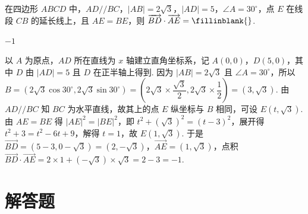 \begin{problem}
在四边形 \(ABCD\) 中，\(AD//BC\)，\(|AB|=2\sqrt3\)，\(|AD|=5\)，\(\angle A=30^\circ\)，点 \(E\) 在线段 \(CB\) 的延长线上，且 \(AE=BE\)，则 \(\overrightarrow{BD}\cdot\overrightarrow{AE}=\fillinblank{}\).
\end{problem}

\begin{answer}
\(-1\)
\end{answer}

\begin{solution}
以 \(A\) 为原点，\(AD\) 所在直线为 \(x\) 轴建立直角坐标系，记 \(A\left(0,0\right)\)，\(D\left(5,0\right)\)，其中 \(D\) 由 \(|AD|=5\) 且 \(D\) 在正半轴上得到. 因为 \(|AB|=2\sqrt{3}\) 且 \(\angle A=30^{\circ}\)，所以 \(B=\left(2\sqrt{3}\cos 30^{\circ},2\sqrt{3}\sin 30^{\circ}\right)=\left(2\sqrt{3}\times\dfrac{\sqrt{3}}{2},2\sqrt{3}\times\dfrac{1}{2}\right)=\left(3,\sqrt{3}\right)\). 由 \(AD//BC\) 知 \(BC\) 为水平直线，故其上的点 \(E\) 纵坐标与 \(B\) 相同，可设 \(E\left(t,\sqrt{3}\right)\). 由 \(AE=BE\) 得 \(|AE|^{2}=|BE|^{2}\)，即 \(t^{2}+\left(\sqrt{3}\right)^{2}=\left(t-3\right)^{2}\)，展开得 \(t^{2}+3=t^{2}-6t+9\)，解得 \(t=1\)，故 \(E\left(1,\sqrt{3}\right)\). 于是 \(\overrightarrow{BD}=\left(5-3,0-\sqrt{3}\right)=\left(2,-\sqrt{3}\right)\)，\(\overrightarrow{AE}=\left(1,\sqrt{3}\right)\)，点积 \(\overrightarrow{BD}\cdot\overrightarrow{AE}=2\times 1+\left(-\sqrt{3}\right)\times\sqrt{3}=2-3=-1\).
\end{solution}
\section{解答题}

